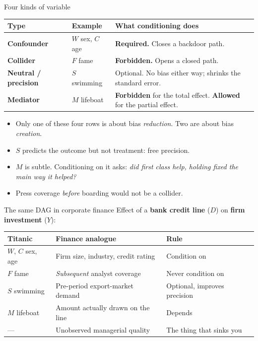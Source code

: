 \documentclass[
  11pt,
  ignorenonframetext,
  aspectratio=169,
]{beamer}
\providecommand{\tightlist}{%
  \setlength{\itemsep}{0pt}\setlength{\parskip}{0pt}}
\begin{document}
\begin{frame}{Four kinds of variable}
\protect{}\label{four-kinds-of-variable}
\begin{center}
\begin{tabular}{llp{6.5cm}}
\toprule
Type & Example & What conditioning does \\
\midrule
\textbf{Confounder}       & $W$ sex, $C$ age & \textbf{Required.} Closes a backdoor path. \\
\textbf{Collider}         & $F$ fame         & \textbf{Forbidden.} Opens a closed path. \\
\textbf{Neutral / precision} & $S$ swimming  & Optional. No bias either way; shrinks the standard error. \\
\textbf{Mediator}         & $M$ lifeboat    & \textbf{Forbidden} for the total effect. \textbf{Allowed} for the partial effect. \\
\bottomrule
\end{tabular}
\end{center}

\vspace{0.4em}

\begin{itemize}
\tightlist
\item
  Only one of these four rows is about bias \emph{reduction}. Two are
  about bias \emph{creation}.
\item
  \(S\) predicts the outcome but not treatment: free precision.
\item
  \(M\) is subtle. Conditioning on it asks: \emph{did first class help,
  holding fixed the main way it helped?}
\item
  Press coverage \emph{before} boarding would not be a collider.
\end{itemize}
\end{frame}

\begin{frame}{The same DAG in corporate finance}
\protect{}\label{the-same-dag-in-corporate-finance}
Effect of a \textbf{bank credit line} (\(D\)) on \textbf{firm
investment} (\(Y\)):

\begin{center}
\begin{tabular}{lll}
\toprule
Titanic & Finance analogue & Rule \\
\midrule
$W$, $C$ sex, age  & Firm size, industry, credit rating & Condition on \\
$F$ fame           & \emph{Subsequent} analyst coverage & Never condition on \\
$S$ swimming       & Pre-period export-market demand    & Optional, improves precision \\
$M$ lifeboat       & Amount actually drawn on the line  & Depends \\
--- & Unobserved managerial quality & The thing that sinks you \\
\bottomrule
\end{tabular}
\end{center}
\end{frame}
\end{document}
